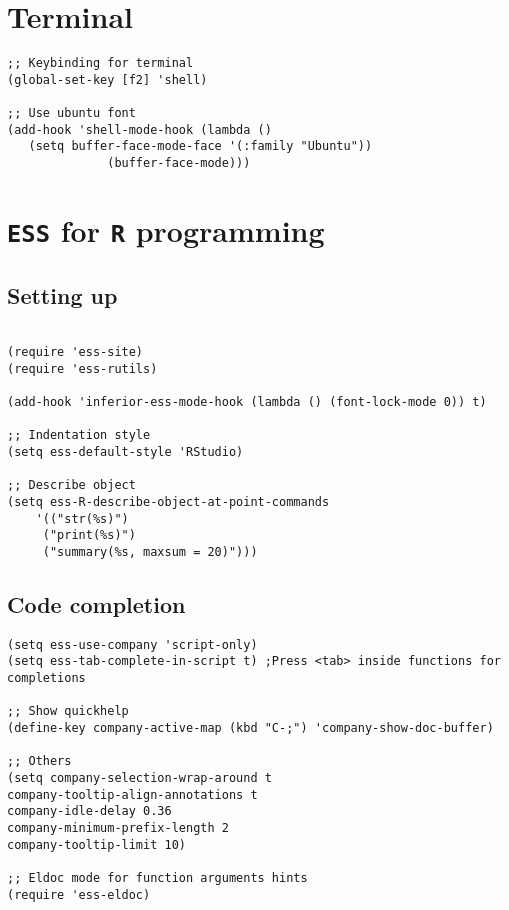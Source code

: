 \documentclass[11pt]{article}
\begin{document}
\section{Terminal}
\label{sec:orgcc31bf0}
\begin{verbatim}
;; Keybinding for terminal
(global-set-key [f2] 'shell)

;; Use ubuntu font
(add-hook 'shell-mode-hook (lambda ()   
   (setq buffer-face-mode-face '(:family "Ubuntu"))
			  (buffer-face-mode)))

\end{verbatim}
\section{\texttt{ESS} for \texttt{R} programming}
\label{sec:orga2d7370}
\subsection{Setting up}
\label{sec:orgc7cf1c0}
\begin{verbatim}

(require 'ess-site)
(require 'ess-rutils)

(add-hook 'inferior-ess-mode-hook (lambda () (font-lock-mode 0)) t)

;; Indentation style
(setq ess-default-style 'RStudio)

;; Describe object
(setq ess-R-describe-object-at-point-commands
    '(("str(%s)")
     ("print(%s)")
     ("summary(%s, maxsum = 20)")))

\end{verbatim}

\subsection{Code completion}
\label{sec:orgf1b1384}
\begin{verbatim}
(setq ess-use-company 'script-only)
(setq ess-tab-complete-in-script t)	;Press <tab> inside functions for completions

;; Show quickhelp
(define-key company-active-map (kbd "C-;") 'company-show-doc-buffer)

;; Others
(setq company-selection-wrap-around t
company-tooltip-align-annotations t
company-idle-delay 0.36
company-minimum-prefix-length 2
company-tooltip-limit 10)

;; Eldoc mode for function arguments hints
(require 'ess-eldoc)

\end{verbatim}
\end{document}
